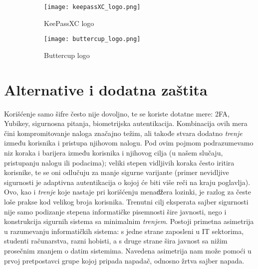 \documentclass[fleqn, 12pt]{article}
\begin{document}
\begin{figure}[h]
    \centering
    \begin{subfigure}[b]{0.45\linewidth}
        \centering
        \texttt{[image: keepassXC\_logo.png]}
        \caption{KeePassXC logo}
        \label{fig:image1}
    \end{subfigure}
    \hfill
    \begin{subfigure}[b]{0.45\linewidth}
        \centering
        \texttt{[image: buttercup\_logo.png]}
        \caption{Buttercup logo}
        \label{fig:image2}
    \end{subfigure}
    \caption{}
    \label{fig:side_by_side}
\end{figure}

\newpage
\section{Alternative i dodatna zaštita}
\indent Korišćenje samo šifre često nije dovoljno, te se koriste dotatne mere: 2FA, Yubikey, sigurnosna pitanja, biometrijska autentikacija. Kombinacija ovih mera čini kompromitovanje naloga značajno težim, ali takođe stvara dodatno \emph{trenje} između korisnika i pristupa njihovom nalogu. Pod ovim pojmom podrazumevamo niz koraka i barijera između korisnika i njihovog cilja (u našem slučaju, pristupanju nalogu ili podacima); veliki stepen vidljivih koraka često iritira korisnike, te se oni odlučuju za manje sigurne varijante (primer nevidljive sigurnosti je adaptivna autentikacija o kojoj će biti više reči na kraju poglavlja). Ovo, kao i \emph{trenje} koje nastaje pri korišćenju menaǆera lozinki, je razlog za česte loše prakse kod velikog broja korisnika. Trenutni cilj eksperata sajber sigurnosti nije samo podizanje stepena informatičke pisemnosti šire javnosti, nego i konstrukcija sigurnih sistema sa minimalnim \emph{trenjem}. Postoji primetna asimetrija u razumevanju informatičkih sistema: s jedne strane zaposleni u IT sektorima, studenti računarstva, razni hobisti, a s druge strane šira javnost sa nižim prosečnim znanjem o datim sistemima. Navedena asimetrija nam može pomoći u prvoj pretpostavci grupe kojoj pripada napadač, odnosno žrtva sajber napada.
\end{document}
